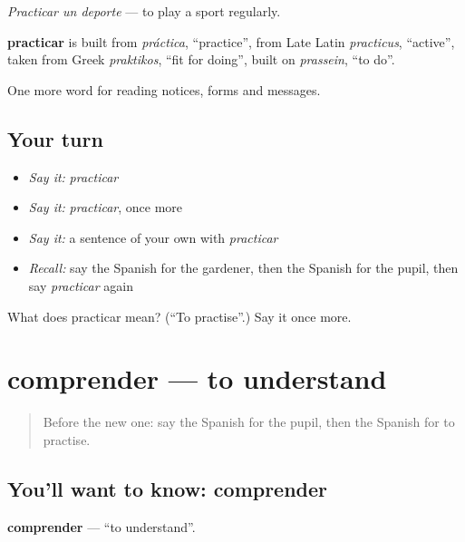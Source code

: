\emph{Practicar un deporte} — to play a sport regularly.

\begin{cousinweb}
\textbf{practicar} is built from \emph{práctica}, \textquotedblleft{}practice\textquotedblright{}, from Late Latin \emph{practicus}, \textquotedblleft{}active\textquotedblright{}, taken from Greek \emph{praktikos}, \textquotedblleft{}fit for doing\textquotedblright{}, built on \emph{prassein}, \textquotedblleft{}to do\textquotedblright{}.
\end{cousinweb}

\begin{grammarlens}[title={What you've built}]
One more word for reading notices, forms and messages.
\end{grammarlens}

\subsection*{Your turn}
\begin{itemize}
\raggedright
  \item \emph{Say it:} \emph{practicar}
  \item \emph{Say it:} \emph{practicar}, once more
  \item \emph{Say it:} a sentence of your own with \emph{practicar}
  \item \emph{Recall:} say the Spanish for the gardener, then the Spanish for the pupil, then say \emph{practicar} again
\end{itemize}

\begin{tcolorbox}[breakable,colback=teal!4,colframe=teal!35!black,title={Before you move on}]
What does practicar mean? (\textquotedblleft{}To practise\textquotedblright{}.) Say it once more.
\end{tcolorbox}
\section[comprender]{comprender — to understand}

\label{lesson:ES-C476-comprender}



\begin{quote}
Before the new one: say the Spanish for the pupil, then the Spanish for to practise.
\end{quote}

\subsection*{You'll want to know: comprender}
\textbf{comprender} — \textquotedblleft{}to understand\textquotedblright{}.

